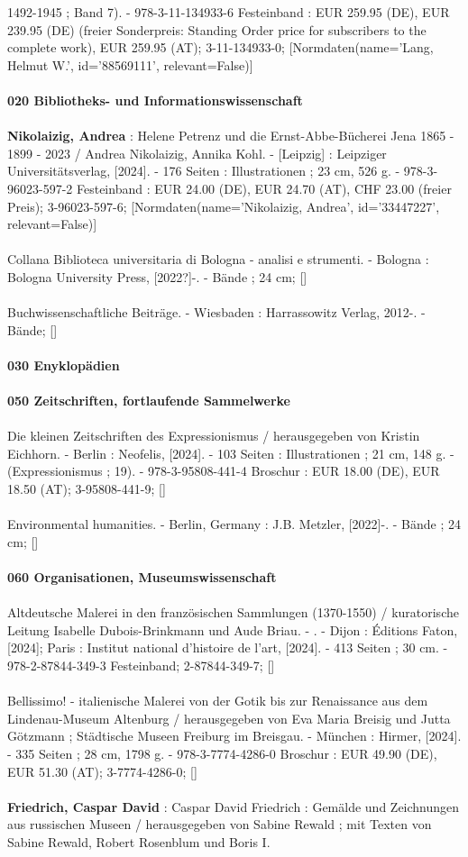 \documentclass{article}
\begin{document}
\begin{multicols}{3}
1492-1945 ; Band 7). - 978-3-11-134933-6 Festeinband : EUR 259.95 (DE), EUR 239.95 (DE) (freier Sonderpreis: Standing Order price for subscribers to the complete work), EUR 259.95 (AT); 3-11-134933-0; [Normdaten(name='Lang, Helmut W.', id='88569111', relevant=False)]\\\\\textbf{020 Bibliotheks- und Informationswissenschaft}\\\\\textbf{Nikolaizig, Andrea} : Helene Petrenz und die Ernst-Abbe-Bücherei Jena 1865 - 1899 - 2023 / Andrea Nikolaizig, Annika Kohl. - [Leipzig] : Leipziger Universitätsverlag, [2024]. - 176 Seiten : Illustrationen ; 23 cm, 526 g. - 978-3-96023-597-2 Festeinband : EUR 24.00 (DE), EUR 24.70 (AT), CHF 23.00 (freier Preis); 3-96023-597-6; [Normdaten(name='Nikolaizig, Andrea', id='33447227', relevant=False)]\\\\Collana Biblioteca universitaria di Bologna - analisi e strumenti. - Bologna : Bologna University Press, [2022?]-. - Bände ; 24 cm; []\\\\Buchwissenschaftliche Beiträge. - Wiesbaden : Harrassowitz Verlag, 2012-. - Bände; []\\\\\textbf{030 Enyklopädien}\\\\\textbf{050 Zeitschriften, fortlaufende Sammelwerke}\\\\Die kleinen Zeitschriften des Expressionismus / herausgegeben von Kristin Eichhorn. - Berlin : Neofelis, [2024]. - 103 Seiten : Illustrationen ; 21 cm, 148 g. - (Expressionismus ; 19). - 978-3-95808-441-4 Broschur : EUR 18.00 (DE), EUR 18.50 (AT); 3-95808-441-9; []\\\\Environmental humanities. - Berlin, Germany : J.B. Metzler, [2022]-. - Bände ; 24 cm; []\\\\\textbf{060 Organisationen, Museumswissenschaft}\\\\Altdeutsche Malerei in den französischen Sammlungen (1370-1550) / kuratorische Leitung Isabelle Dubois-Brinkmann und Aude Briau. - . - Dijon : Éditions Faton, [2024]; Paris : Institut national d'histoire de l'art, [2024]. - 413 Seiten ; 30 cm. - 978-2-87844-349-3 Festeinband; 2-87844-349-7; []\\\\Bellissimo! - italienische Malerei von der Gotik bis zur Renaissance aus dem Lindenau-Museum Altenburg / herausgegeben von Eva Maria Breisig und Jutta Götzmann ; Städtische Museen Freiburg im Breisgau. - München : Hirmer, [2024]. - 335 Seiten ; 28 cm, 1798 g. - 978-3-7774-4286-0 Broschur : EUR 49.90 (DE), EUR 51.30 (AT); 3-7774-4286-0; []\\\\\textbf{Friedrich, Caspar David} : Caspar David Friedrich : Gemälde und Zeichnungen aus russischen Museen / herausgegeben von Sabine Rewald ; mit Texten von Sabine Rewald, Robert Rosenblum und Boris I. 
\end{multicols}
\end{document}
